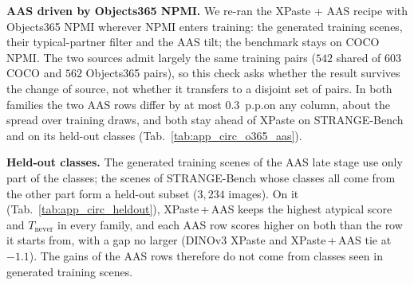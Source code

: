 \begin{table}[!htp]%
\centering
\footnotesize
\setlength{\tabcolsep}{4pt}
\renewcommand{\arraystretch}{0.9}
\caption{\textbf{COCO \texttt{val} paired splits defined by COCO or by Objects365 NPMI.} Every row keeps a gap on the Objects365-NPMI split, $0.5$ to $3.9$~p.p.\@ smaller than on the COCO-NPMI split. Baseline, paste and AAS rows of Tabs.~\ref{tab:codino_main} to~\ref{tab:dinov3_main} (same checkpoints). Both splits use the same construction and image pool (App.~\ref{app:splits-impl}) but select different images. Detectors: full-annotation AP; DINOv3: F1$_{\text{micro}}$.}
\label{tab:app_circ_reslice}

\end{table}

\noindent\textbf{AAS driven by Objects365 NPMI.} We re-ran the XPaste + AAS recipe with Objects365 NPMI wherever NPMI enters training: the generated training scenes, their typical-partner filter and the AAS tilt; the benchmark stays on COCO NPMI. The two sources admit largely the same training pairs ($542$ shared of $603$ COCO and $562$ Objects365 pairs), so this check asks whether the result survives the change of source, not whether it transfers to a disjoint set of pairs. In both families the two AAS rows differ by at most $0.3$~p.p.\@ on any column, about the spread over training draws, and both stay ahead of XPaste on STRANGE-Bench and on its held-out classes (Tab.~\ref{tab:app_circ_o365_aas}).

\begin{table}[!htp]%
\centering
\footnotesize
\setlength{\tabcolsep}{4pt}
\renewcommand{\arraystretch}{0.9}
\caption{\textbf{XPaste + AAS driven by COCO or by Objects365 NPMI.} The two AAS rows differ by at most $0.3$~p.p.\@ on any column, and both stay ahead of XPaste on STRANGE-Bench and on its held-out classes. Objects365 NPMI replaces COCO NPMI in the generated training scenes, their filter and the AAS tilt; the benchmark stays on COCO NPMI. Means over $n$ training draws; Co-DINO rows are late-stage models trained on mini-COCO (App.~\ref{app:beta_sweep}). Held-out classes: the subset of STRANGE-Bench whose classes never appear in the generated training scenes.}
\label{tab:app_circ_o365_aas}

\end{table}

\noindent\textbf{Held-out classes.} The generated training scenes of the AAS late stage use only part of the classes; the scenes of STRANGE-Bench whose classes all come from the other part form a held-out subset ($3{,}234$ images). On it (Tab.~\ref{tab:app_circ_heldout}), XPaste\,+\,AAS keeps the highest atypical score and $T_{\text{never}}$ in every family, and each AAS row scores higher on both than the row it starts from, with a gap no larger (DINOv3 XPaste and XPaste\,+\,AAS tie at $-1.1$). The gains of the AAS rows therefore do not come from classes seen in generated training scenes.

